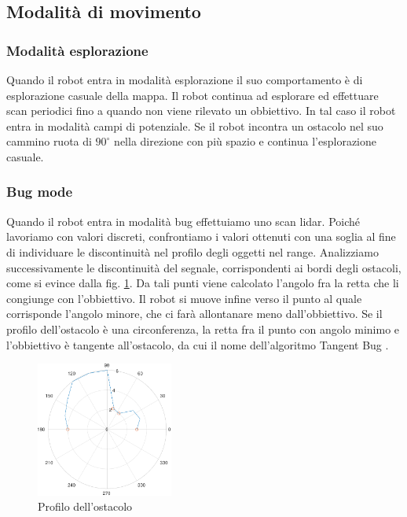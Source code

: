 \documentclass[a4paper]{article}
\begin{document}
	\subsection{Modalità di movimento}\label{subsec:Modalità-di-movimento}
	
	\subsubsection{Modalità esplorazione}
	Quando il robot entra in modalità esplorazione il suo comportamento è di esplorazione casuale della mappa. Il robot continua ad esplorare ed effettuare scan periodici fino a quando non viene rilevato un obbiettivo. In tal caso il robot entra in modalità campi di potenziale. Se il robot incontra un ostacolo nel suo cammino ruota di $90^{\circ}$ nella direzione con più spazio e continua l'esplorazione casuale.
	
	\subsubsection{Bug mode}
	Quando il robot entra in modalità bug effettuiamo uno scan lidar. Poiché lavoriamo con valori discreti, confrontiamo i valori ottenuti con una soglia al fine di individuare le discontinuità nel profilo degli oggetti nel range. Analizziamo successivamente le discontinuità del segnale, corrispondenti ai bordi degli ostacoli, come si evince dalla fig. \ref{fig:bug}. Da tali punti viene calcolato l'angolo fra la retta che li congiunge con l'obbiettivo. Il robot si muove infine verso il punto al quale corrisponde l'angolo minore, che ci farà allontanare meno dall'obbiettivo. Se il profilo dell'ostacolo è una circonferenza, la retta fra il punto con angolo minimo e l'obbiettivo è tangente all'ostacolo, da cui il nome dell'algoritmo Tangent Bug \cite{503814}.
	
	\begin{figure}[H]
		\centering
		\includegraphics[width=0.4\textwidth]{./img/bug.pdf}
		\caption{Profilo dell'ostacolo}
		\label{fig:bug}
	\end{figure}
\end{document}
